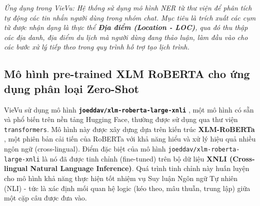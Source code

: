 \textit{Ứng dụng trong VieVu: Hệ thống sử dụng mô hình NER từ thư viện để phân tích tự động các tin nhắn người dùng trong nhóm chat. Mục tiêu là trích xuất các cụm từ được nhận dạng là thực thể \textbf{Địa điểm (Location - LOC)}, qua đó thu thập các địa danh, địa điểm du lịch mà người dùng đang thảo luận, làm đầu vào cho các bước xử lý tiếp theo trong quy trình hỗ trợ tạo lịch trình.}

\subsection{Mô hình pre-trained XLM RoBERTA cho ứng dụng phân loại Zero-Shot}



VieVu sử dụng mô hình \textbf{\texttt{joeddav/xlm-roberta-large-xnli}} \cite{xlm_roberta_xnli_model}, một mô hình có sẵn và phổ biến trên nền tảng Hugging Face, thường được sử dụng qua thư viện \texttt{transformers}. Mô hình này được xây dựng dựa trên kiến trúc \textbf{XLM-RoBERTa} \cite{xlm_roberta_paper}, một phiên bản cải tiến của RoBERTa với khả năng hiểu và xử lý hiệu quả nhiều ngôn ngữ (cross-lingual). Điểm đặc biệt của mô hình \texttt{joeddav/xlm-roberta-large-xnli} là nó đã được tinh chỉnh (fine-tuned) trên bộ dữ liệu \textbf{XNLI (Cross-lingual Natural Language Inference)}. Quá trình tinh chỉnh này huấn luyện cho mô hình khả năng thực hiện tốt nhiệm vụ Suy luận Ngôn ngữ Tự nhiên (NLI) - tức là xác định mối quan hệ logic (kéo theo, mâu thuẫn, trung lập) giữa một cặp câu được đưa vào.

